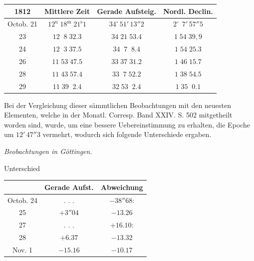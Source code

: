 \begin{center}
\fontsize{10}{12}\selectfont\setlength{\tabcolsep}{4pt}\renewcommand{\arraystretch}{1.15}\begin{tabular}{|c|c|c|c|}
\hline
1812 & Mittlere Zeit & Gerade Aufsteig. & Nordl. Declin. \\
\hline
Octob. 21 & $12^{\mathrm u}\;18^{\mathrm m}\;21^{\mathrm s}1$ & $34^\circ\,51'\,13''2$ & $2^\circ\,\;7'\,57''5$ \\
23 & $12\;\;8\;32.3$ & $34\;21\;53.4$ & $1\;54\;39{,}9$ \\
24 & $12\;\;3\;37.5$ & $34\;\;7\;\;8.4$ & $1\;54\;25.3$ \\
26 & $11\;53\;47.5$ & $33\;37\;31.2$ & $1\;46\;15.7$ \\
28 & $11\;43\;57.4$ & $33\;\;7\;52.2$ & $1\;38\;54.5$ \\
29 & $11\;39\;\;2.4$ & $32\;53\;\;2.4$ & $1\;35\;\;0.1$ \\
\hline
\end{tabular}
\end{center}

\par\indent Bei der Vergleichung dieser sämmtlichen Beobachtungen mit den neuesten Elementen, welche in der
Monatl. Corresp. Band XXIV. S. 502 mitgetheilt worden sind, wurde, um eine bessere Uebereinstimmung
zu erhalten, die Epoche um $12'\,47''3$ vermehrt, wodurch sich folgende Unterschiede ergaben.

\medskip
{}\begin{center}
\emph{Beobachtungen in Göttingen.}\par
Unterschied

\fontsize{10}{12}\selectfont\setlength{\tabcolsep}{7pt}\renewcommand{\arraystretch}{1.15}\begin{tabular}{|c|c|c|}
\hline
 & Gerade Aufst. & Abweichung \\
\hline
Octob. 24 & . . . & $-38''68$: \\
25 & $+3''04$ & $-13.26$ \\
27 & . . . & $+16.10$: \\
28 & $+6.37$ & $-13.32$ \\
Nov. 1 & $-15.16$ & $-10.17$ \\
\hline
\end{tabular}
\end{center}

